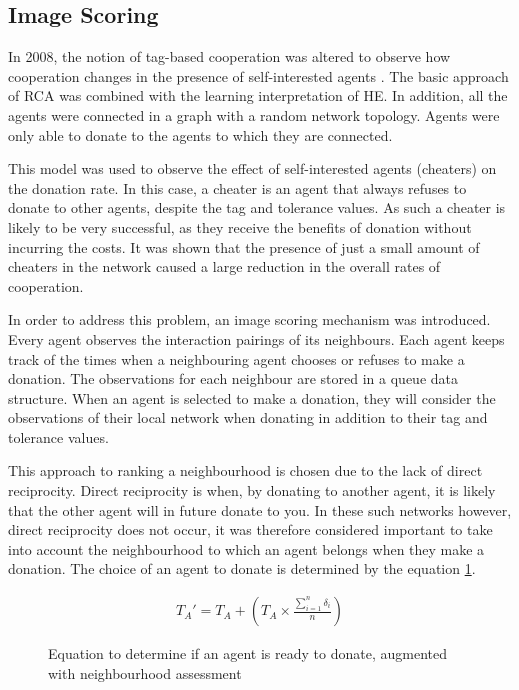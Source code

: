 \subsection{Image Scoring}

In 2008, the notion of tag-based cooperation was altered to observe how cooperation changes in the presence of self-interested agents \cite{aamas2008}.
The basic approach of RCA was combined with the learning interpretation of HE.
In addition, all the agents were connected in a graph with a random network topology.
Agents were only able to donate to the agents to which they are connected.

This model was used to observe the effect of self-interested agents (cheaters)
on the donation rate.
In this case, a cheater is an agent that always refuses to donate to other agents, despite the tag and tolerance values.
As such a cheater is likely to be very successful, as they receive the benefits of donation without incurring the costs.
It was shown that the presence of just a small amount of cheaters in the network
caused a large reduction in the overall rates of cooperation.

In order to address this problem, an image scoring mechanism was introduced.
Every agent observes the interaction pairings of its neighbours.
Each agent keeps track of the times when a neighbouring agent chooses or refuses to make a donation.
The observations for each neighbour are stored in a queue data structure.
When an agent is selected to make a donation, they will consider the observations of their local network
when donating in addition to their tag and tolerance values.

This approach to ranking a neighbourhood is chosen due to the lack of direct reciprocity.
Direct reciprocity is when, by donating to another agent, it is likely that the other agent will in future donate to you.
In these such networks however, direct reciprocity does not occur,
it was therefore considered important to take into account the neighbourhood to which an agent belongs when they make a donation.
The choice of an agent to donate is determined by the equation \ref{fig:aamas-2008-donation-eqn}.

\begin{figure}[htbp]
\begin{align*}
    T_A' = T_A + \left(T_A \times \frac{\sum_{i = 1}^{n}\delta_i}{n}\right)
\end{align*}
\caption{Equation to determine if an agent is ready to donate, augmented with neighbourhood assessment}
\label{fig:aamas-2008-donation-eqn}
\end{figure}

